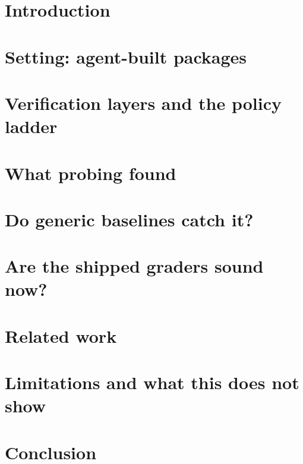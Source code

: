 \documentclass{article}
\begin{document}
\section{Introduction}



\section{Setting: \suitePackages{} agent-built packages}
\label{sec:setting}



\section{Verification layers and the policy ladder}
\label{sec:layers}


\section{What probing found}
\label{sec:review}



\section{Do generic baselines catch it?}
\label{sec:prereg}


\section{Are the shipped graders sound now?}
\label{sec:soundness}



\section{Related work}


\section{Limitations and what this does not show}
\label{sec:limits}


\section{Conclusion}
\label{sec:conclusion}

\end{document}
